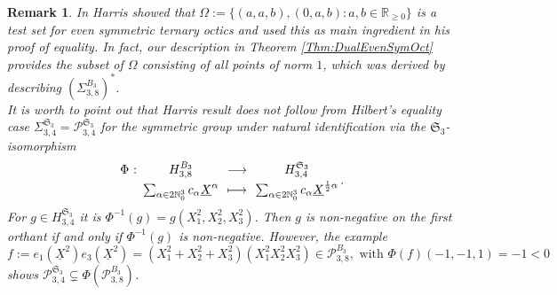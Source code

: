\documentclass[11pt,a4paper]{amsart}
\newcommand{\abb}[5]{%
\setlength{\arraycolsep}{0.4ex}%
\begin{array}{rcccc}%
#1 &:\,& #2 & \,\,\longrightarrow\,\, & #3 \\[0.5ex]%
     & & #4 & \longmapsto & #5%
\end{array}%
}
\numberwithin{equation}{section}
\newtheorem{remark}[thm]{Remark}
\theoremstyle{definition}
\newcommand{\N}{\mathbb{N}}
\newcommand{\R}{\mathbb{R}}
\numberwithin{thm}{section}
\theoremstyle{break}
\numberwithin{subcase}{case}
\begin{document}
 \begin{remark}
In \cite{harris1999real} Harris showed that $\Omega := \{(a,a,b),(0,a,b) : a,b \in \R_{\geq 0}\}$ is a test set for even symmetric ternary octics and used this as main ingredient in his proof of equality. In fact, our description in Theorem \ref{Thm:DualEvenSymOct} provides the subset of $\Omega$ consisting of all points of norm $1$, which was derived by describing $\left( \Sigma_{3,8}^{B_3}\right)^\ast$. \\
It is worth to point out that Harris result does not follow from Hilbert's equality case $\Sigma_{3,4}^{\mathfrak{S}_3} = \mathcal{P}_{3,4}^{\mathfrak{S}_3}$ for the symmetric group under natural identification via the $\mathfrak{S}_3$-isomorphism $$
\abb{\Phi}{ H_{3,8}^{B_3}}{H_{3,4}^{\mathfrak{S}_3}}{\sum_{\alpha \in 2\N_0^3}c_\alpha \underline{X}^\alpha}{\sum_{\alpha \in 2\N_0^3} c_\alpha \underline{X}^{\frac{1}{2}\alpha}}.$$ For $g \in H_{3,4}^{\mathfrak{S}_3}$ it is $\Phi^{-1}(g)=g(X_1^2,X_2^2,X_3^2)$. Then $g$ is non-negative on the first orthant if and only if $\Phi^{-1}(g)$ is non-negative. However, the example $$f := e_1(\underline{X}^2)e_3(\underline{X}^2)=(X_1^2+X_2^2+X_3^2)(X_1^2X_2^2X_3^2) \in \mathcal{P}_{3,8}^{B_3}, \text{ with }\Phi (f)(-1,-1,1) = -1 < 0$$ shows $\mathcal{P}_{3,4}^{\mathfrak{S}_3} \subsetneq \Phi (\mathcal{P}_{3,8}^{B_3})$.
  \end{remark}
\end{document}

